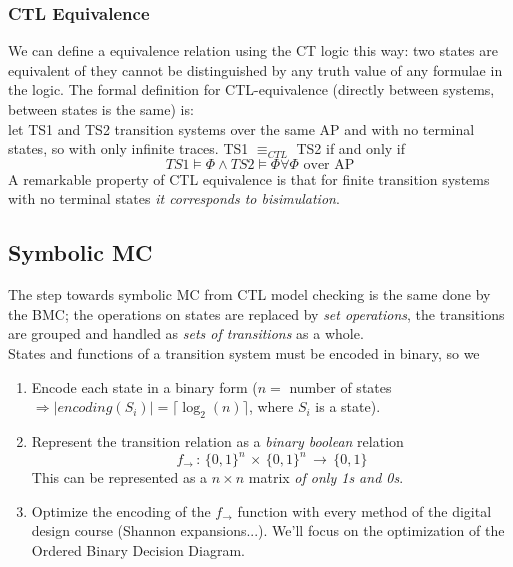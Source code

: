 \documentclass{article}
\begin{document}
				\subsubsection{CTL Equivalence}
					We can define a equivalence relation using the CT logic this way: two states are equivalent of they cannot be distinguished by any truth value of any formulae in the logic. The formal definition for CTL-equivalence (directly between systems, between states is the same) is:\\
					let TS1 and TS2 transition systems over the same AP and with no terminal states, so with only infinite traces. TS1 $\equiv_{CTL}$ TS2 if and only if
					\begin{equation}
						TS1 \models \Phi \wedge TS2 \models \Phi \forall \Phi \text{ over AP}
					\end{equation}
					A remarkable property of CTL equivalence is that for finite transition systems with no terminal states \emph{it corresponds to bisimulation}.
					
			\subsection{Symbolic MC}
				The step towards symbolic MC from CTL model checking is the same done by the BMC; the operations on states are replaced by \emph{set operations}, the transitions are grouped and handled as \emph{sets of transitions} as a whole.\\
				States and functions of a transition system must be encoded in binary, so we
				\begin{enumerate}
					\item Encode each state in a binary form ($n = $ number of states $\Rightarrow \vert encoding(S_i) \vert = \lceil \log_2(n) \rceil$, where $S_i$ is a state).
					\item Represent the transition relation as a \emph{binary boolean} relation
						\begin{equation}
							f_{\rightarrow} \,:\, \{0,1\}^n \,\times\, \{0,1\}^n \,\rightarrow\, \{0, 1\}
						\end{equation}
						This can be represented as a $n \times n$ matrix \emph{of only 1s and 0s}.
					\item Optimize the encoding of the $f_{\rightarrow}$ function with every method of the digital design course (Shannon expansions...). We'll focus on the optimization of the Ordered Binary Decision Diagram.
				\end{enumerate}
				
\end{document}
